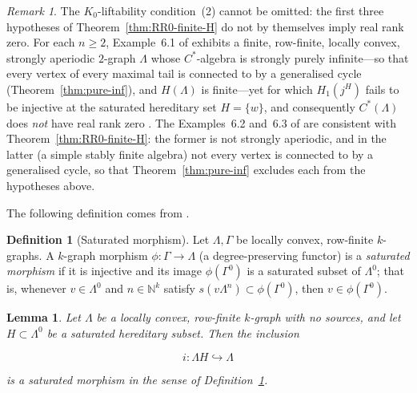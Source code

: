 \documentclass[12pt]{amsart}
\theoremstyle{plain}
\newtheorem{lemma}[theorem]{Lemma}
\theoremstyle{definition}
\newtheorem{definition}[theorem]{Definition}
\theoremstyle{remark}
\newtheorem{remark}[theorem]{Remark}
\newcommand{\N}{\mathbb{N}}
\begin{document}
\begin{remark}\label{rem:PSS2-6.1}
The $K_0$-liftability condition~(2) cannot be omitted: the first three
hypotheses of Theorem~\ref{thm:RR0-finite-H} do not by themselves imply real
rank zero. For each $n\ge 2$, Example~6.1 of \cite{PSS2} exhibits a finite,
row-finite, locally convex, strongly aperiodic $2$-graph $\Lambda$ whose
$C^*$-algebra is strongly purely infinite---so that every vertex of every
maximal tail is connected to by a generalised cycle
(Theorem~\ref{thm:pure-inf}), and $H(\Lambda)$ is finite---yet for which
$H_1(j^{H})$ fails to be injective at the saturated hereditary set
$H=\{w\}$, and consequently $C^*(\Lambda)$ does \emph{not} have real rank
zero \cite[Theorem~4.3]{PSS2}. The Examples~6.2 and~6.3 of \cite{PSS2} are
consistent with Theorem~\ref{thm:RR0-finite-H}: the former is not strongly
aperiodic, and in the latter (a simple stably finite algebra) not every
vertex is connected to by a generalised cycle, so that
Theorem~\ref{thm:pure-inf} excludes each from the hypotheses above.
\end{remark}

\noindent
The following definition comes from \cite[Definition 5.1]{A}.

\begin{definition}[Saturated morphism]\label{def:saturated-morphism}
Let $\Lambda,\Gamma$ be locally convex, row-finite $k$-graphs. A $k$-graph
morphism $\phi:\Gamma\to\Lambda$ (a degree-preserving functor) is a
\emph{saturated morphism} if it is injective and its image $\phi(\Gamma^0)$
is a saturated subset of $\Lambda^0$; that is, whenever $v\in\Lambda^0$ and
$n\in\N^k$ satisfy $s(v\Lambda^n)\subset\phi(\Gamma^0)$, then
$v\in\phi(\Gamma^0)$.
\end{definition}

\begin{lemma}\label{lem:saturated-morphism}
Let $\Lambda$ be a locally convex, row-finite $k$-graph with no sources, and
let $H\subset\Lambda^0$ be a saturated hereditary subset. Then the inclusion


\[
i : \Lambda H \hookrightarrow \Lambda
\]


is a saturated morphism in the sense of Definition~\ref{def:saturated-morphism}.
\end{lemma}
\end{document}
